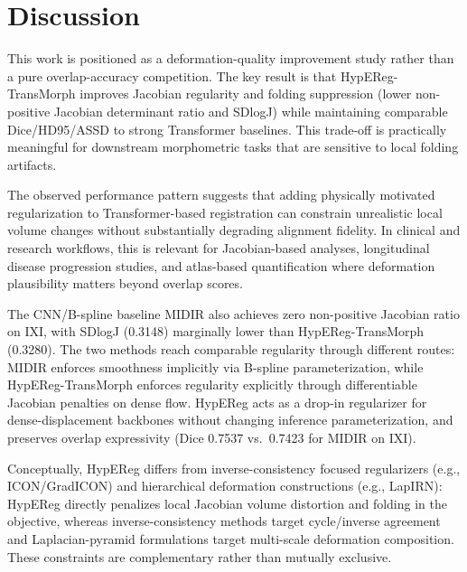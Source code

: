 \documentclass[11pt,a4paper]{article}
\begin{document}
\section{Discussion}

This work is positioned as a deformation-quality improvement study rather than a pure overlap-accuracy competition. The key result is that HypEReg-TransMorph improves Jacobian regularity and folding suppression (lower non-positive Jacobian determinant ratio and SDlogJ) while maintaining comparable Dice/HD95/ASSD to strong Transformer baselines. This trade-off is practically meaningful for downstream morphometric tasks that are sensitive to local folding artifacts.

The observed performance pattern suggests that adding physically motivated regularization to Transformer-based registration can constrain unrealistic local volume changes without substantially degrading alignment fidelity. In clinical and research workflows, this is relevant for Jacobian-based analyses, longitudinal disease progression studies, and atlas-based quantification where deformation plausibility matters beyond overlap scores.

The CNN/B-spline baseline MIDIR also achieves zero non-positive Jacobian ratio on IXI, with SDlogJ (0.3148) marginally lower than HypEReg-TransMorph (0.3280). The two methods reach comparable regularity through different routes: MIDIR enforces smoothness implicitly via B-spline parameterization, while HypEReg-TransMorph enforces regularity explicitly through differentiable Jacobian penalties on dense flow. HypEReg acts as a drop-in regularizer for dense-displacement backbones without changing inference parameterization, and preserves overlap expressivity (Dice 0.7537 vs.\ 0.7423 for MIDIR on IXI).

Conceptually, HypEReg differs from inverse-consistency focused regularizers (e.g., ICON/GradICON) and hierarchical deformation constructions (e.g., LapIRN): HypEReg directly penalizes local Jacobian volume distortion and folding in the objective, whereas inverse-consistency methods target cycle/inverse agreement and Laplacian-pyramid formulations target multi-scale deformation composition. These constraints are complementary rather than mutually exclusive.
\end{document}
